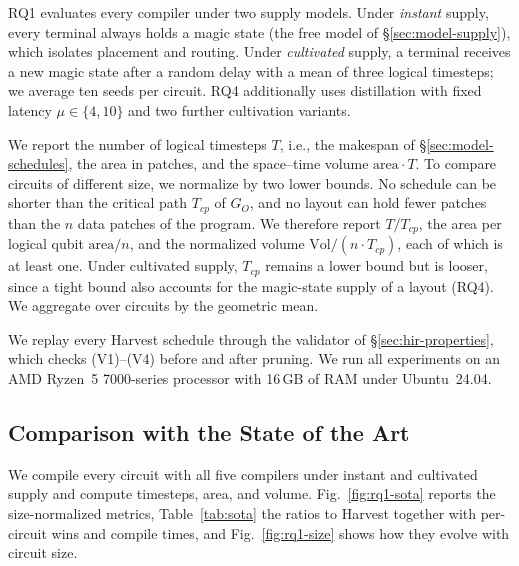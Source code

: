 RQ1 evaluates every compiler under two supply models.
Under \emph{instant} supply, every terminal always holds a magic state (the free model of \S\ref{sec:model-supply}), which isolates placement and routing.
Under \emph{cultivated} supply, a terminal receives a new magic state after a random delay with a mean of three logical timesteps; we average ten seeds per circuit.
RQ4 additionally uses distillation with fixed latency $\mu \in \{4, 10\}$ and two further cultivation variants.

We report the number of logical timesteps $T$, i.e., the makespan of \S\ref{sec:model-schedules}, the area in patches, and the space--time volume $\text{area} \cdot T$.
To compare circuits of different size, we normalize by two lower bounds.
No schedule can be shorter than the critical path $T_{cp}$ of $G_O$, and no layout can hold fewer patches than the $n$ data patches of the program.
We therefore report $T/T_{cp}$, the area per logical qubit $\text{area}/n$, and the normalized volume $\text{Vol}/(n \cdot T_{cp})$, each of which is at least one.
Under cultivated supply, $T_{cp}$ remains a lower bound but is looser, since a tight bound also accounts for the magic-state supply of a layout (RQ4).
We aggregate over circuits by the geometric mean.

We replay every Harvest schedule through the validator of \S\ref{sec:hir-properties}, which checks (V1)--(V4) before and after pruning.
We run all experiments on  an AMD Ryzen~5 7000-series processor with 16\,GB of RAM under Ubuntu~24.04.

\subsection{Comparison with the State of the Art}
\label{sec:eval-sota}






We compile every circuit with all five compilers under instant and cultivated supply and compute timesteps, area, and volume.
Fig.~\ref{fig:rq1-sota} reports the size-normalized metrics, Table~\ref{tab:sota} the ratios to Harvest together with per-circuit wins and compile times, and Fig.~\ref{fig:rq1-size} shows how they evolve with circuit size.

